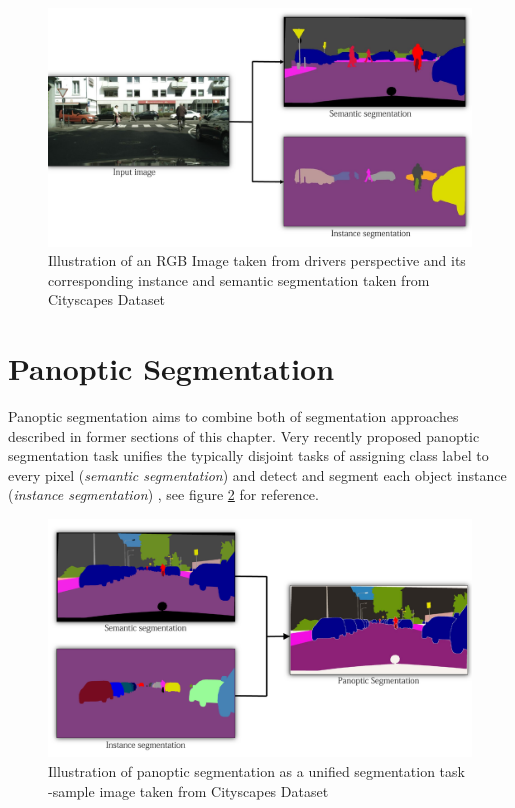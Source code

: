 \begin{figure}[!ht]
    \includegraphics[width = \textwidth]{Graphics/Related_Work/SemInstImage.pdf}
    \caption[Semantic vs Instance Segmentation]{Illustration of an RGB Image taken from drivers perspective and its corresponding instance and semantic segmentation taken from Cityscapes Dataset \cite{Cordts2015}}
    \label{fig:rgb_instsemseg}
\end{figure}

\section{Panoptic Segmentation}

Panoptic segmentation aims to combine both of segmentation approaches described in former sections of this chapter. Very recently proposed panoptic segmentation task unifies the typically disjoint tasks of assigning class label to every pixel (\textit{semantic segmentation}) and detect and segment each object instance (\textit{instance segmentation}) \cite{Kirillov2019}, see figure \ref{fig:panoptic_seg} for reference.

\begin{figure}[!ht]
    \includegraphics[width = \textwidth]{Graphics/Related_Work/PanopticSeg.pdf}
    \caption[Panoptic Segmentation]{Illustration of panoptic segmentation as a unified segmentation task -sample image taken from Cityscapes Dataset \cite{Cordts2015}}
    \label{fig:panoptic_seg}
\end{figure}


